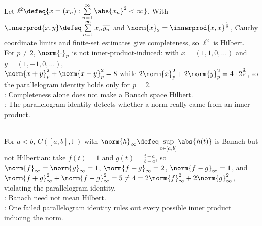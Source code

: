 \begin{example} \label{ex:l2-hilbert-and-lp-parallelogram-test} \\
Let $\ell^2\defeq\{x=(x_n):\sum\limits_{n=1}^{\infty}\abs{x_n}^2<\infty\}$. With $\innerprod{x,y}\defeq\sum\limits_{n=1}^{\infty}x_n\overline{y_n}$ and $\norm{x}_2=\innerprod{x,x}^{\frac{1}{2}}$, Cauchy coordinate limits and finite-set estimates give completeness, so $\ell^2$ is Hilbert.\\
For $p\neq2$, $\norm{\cdot}_p$ is not inner-product-induced: with $x=(1,1,0,\ldots)$ and $y=(1,-1,0,\ldots)$,\\
$\norm{x+y}_p^2+\norm{x-y}_p^2=8$ while $2\norm{x}_p^2+2\norm{y}_p^2=4\cdot2^{\frac{2}{p}}$, so the parallelogram identity holds only for $p=2$.\\
: Completeness alone does not make a Banach space Hilbert.\\
: The parallelogram identity detects whether a norm really came from an inner product.
\end{example}

\begin{example} \label{ex:sup-norm-continuous-functions-not-hilbert} \\
For $a<b$, $C([a,b],\mathbb{F})$ with $\norm{h}_\infty\defeq\sup\limits_{t\in[a,b]}\abs{h(t)}$ is Banach but not Hilbertian: take $f(t)=1$ and $g(t)=\frac{t-a}{b-a}$, so $\norm{f}_\infty=\norm{g}_\infty=1$, $\norm{f+g}_\infty=2$, $\norm{f-g}_\infty=1$, and $\norm{f+g}_\infty^2+\norm{f-g}_\infty^2=5\neq4=2\norm{f}_\infty^2+2\norm{g}_\infty^2$, violating the parallelogram identity.\\
: Banach need not mean Hilbert.\\
: One failed parallelogram identity rules out every possible inner product inducing the norm.
\end{example}

